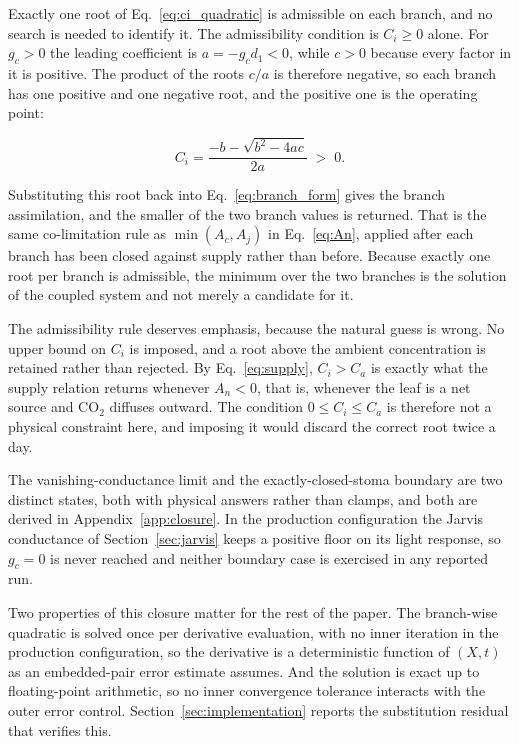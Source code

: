 Exactly one root of Eq.~\eqref{eq:ci_quadratic} is admissible on each branch, and
no search is needed to identify it. The admissibility condition is $C_i \geq 0$
alone. For $g_c > 0$ the leading coefficient is $a = -g_c d_1 < 0$, while $c > 0$
because every factor in it is positive. The product of the roots $c/a$ is
therefore negative, so each branch has one positive and one negative root, and the
positive one is the operating point:

\begin{equation}
C_i =
\frac{-b - \sqrt{b^{2} - 4ac}}{2a}
\;>\; 0 .
\label{eq:ci_root}
\end{equation}

Substituting this root back into Eq.~\eqref{eq:branch_form} gives the branch
assimilation, and the smaller of the two branch values is returned. That is the
same co-limitation rule as $\min(A_c,A_j)$ in Eq.~\eqref{eq:An}, applied after
each branch has been closed against supply rather than before. Because exactly one
root per branch is admissible, the minimum over the two branches is the solution
of the coupled system and not merely a candidate for it.

The admissibility rule deserves emphasis, because the natural guess is wrong. No
upper bound on $C_i$ is imposed, and a root above the ambient concentration is
retained rather than rejected. By Eq.~\eqref{eq:supply}, $C_i > C_a$ is exactly
what the supply relation returns whenever $A_n < 0$, that is, whenever the leaf is
a net source and CO$_2$ diffuses outward. The condition $0 \le C_i \le C_a$ is
therefore not a physical constraint here, and imposing it would discard the
correct root twice a day.

The vanishing-conductance limit and the exactly-closed-stoma boundary are two
distinct states, both with physical answers rather than clamps, and both are
derived in Appendix~\ref{app:closure}. In the production configuration the Jarvis
conductance of Section~\ref{sec:jarvis} keeps a positive floor on its light
response, so $g_c=0$ is never reached and neither boundary case is exercised in
any reported run.

Two properties of this closure matter for the rest of the paper. The branch-wise
quadratic is solved once per derivative evaluation, with no inner iteration in the
production configuration, so the derivative is a deterministic function of $(X,t)$
as an embedded-pair error estimate assumes. And the solution is exact up to
floating-point arithmetic, so no inner convergence tolerance interacts with the
outer error control. Section~\ref{sec:implementation} reports the substitution
residual that verifies this.

